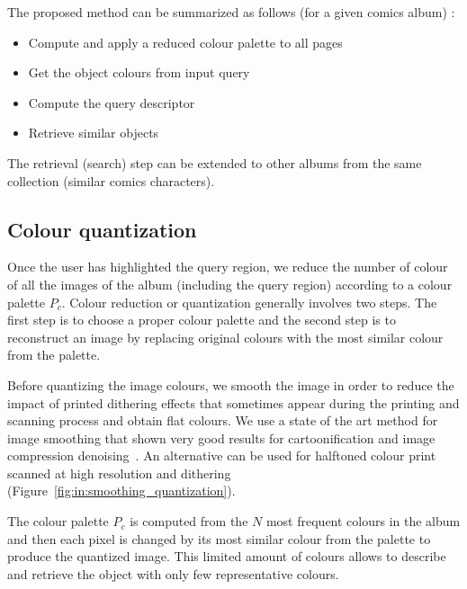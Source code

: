 The proposed method can be summarized as follows (for a given comics album) :
\begin{itemize}
  \item Compute and apply a reduced colour palette to all pages
  \item Get the object colours from input query
  \item Compute the query descriptor
  \item Retrieve similar objects
\end{itemize}

The retrieval (search) step can be extended to other albums from the same collection (similar comics characters).
 


\subsection{Colour quantization}
Once the user has highlighted the query region, we reduce the number of colour of all the images of the album (including the query region) according to a colour palette $P_c$.
Colour reduction or quantization generally involves two steps.
The first step is to choose a proper colour palette and the second step is to reconstruct an image by replacing original colours with the most similar colour from the palette.


Before quantizing the image colours, we smooth the image in order to reduce the impact of printed dithering effects that sometimes appear during the printing and scanning process and obtain flat colours.
We use a state of the art method for image smoothing that shown very good results for cartoonification and image compression denoising~\cite{l0smoothing2011}.
An alternative can be used for halftoned colour print scanned at high resolution and dithering~\cite{Kopf2012DigitalReconstruction} (Figure~\ref{fig:in:smoothing_quantization}).

The colour palette $P_c$ is computed from the $N$ most frequent colours in the album and then each pixel is changed by its most similar colour from the palette to produce the quantized image.
This limited amount of colours allows to describe and retrieve the object with only few representative colours.

